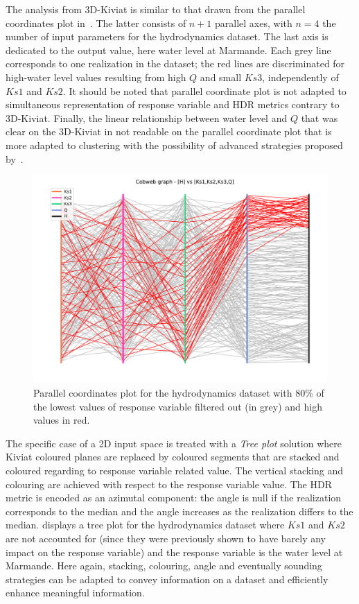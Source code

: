 The analysis from 3D-Kiviat is similar to that drawn from the parallel coordinates plot in~. The latter consists of $n+1$ parallel axes, with $n=4$ the number of input parameters for the hydrodynamics dataset. The last axis is dedicated to the output value, here water level at Marmande. Each grey line corresponds to one realization in the dataset; the red lines are discriminated for high-water level values resulting from high $Q$ and small $Ks3$, independently of $Ks1$ and $Ks2$. It should be noted that parallel coordinate plot is not adapted to simultaneous representation of response variable and HDR metrics contrary to 3D-Kiviat. Finally, the linear relationship between water level and $Q$ that was clear on the 3D-Kiviat in not readable on the parallel coordinate plot that is more adapted to clustering with the possibility of advanced strategies proposed by~\citep{Claessen2011,Raidou2016}.

\begin{figure}[!ht]
\centering
\includegraphics[width=0.8\linewidth,keepaspectratio]{fig/contributions/visu/mascaret_cobweb.pdf}
\caption{Parallel coordinates plot for the hydrodynamics dataset with 80\% of the lowest values of response variable filtered out (in grey) and high values in red.}
\label{fig:cobweb-Kiviat}
\end{figure}

The specific case of a 2D input space is treated with a \emph{Tree plot} solution where Kiviat coloured planes are replaced by coloured segments that are stacked and coloured regarding to response variable related value. The vertical stacking and colouring are achieved with respect to the response variable value. The HDR metric is encoded as an azimutal component: the angle is null if the realization corresponds to the median and the angle increases as the realization differs to the median.  displays a tree plot for the hydrodynamics dataset where $Ks1$ and $Ks2$ are not accounted for (since they were previously shown to have barely any impact on the response variable) and the response variable is the water level at Marmande. Here again, stacking, colouring, angle and eventually sounding strategies can be adapted to convey information on a dataset and efficiently enhance meaningful information.

